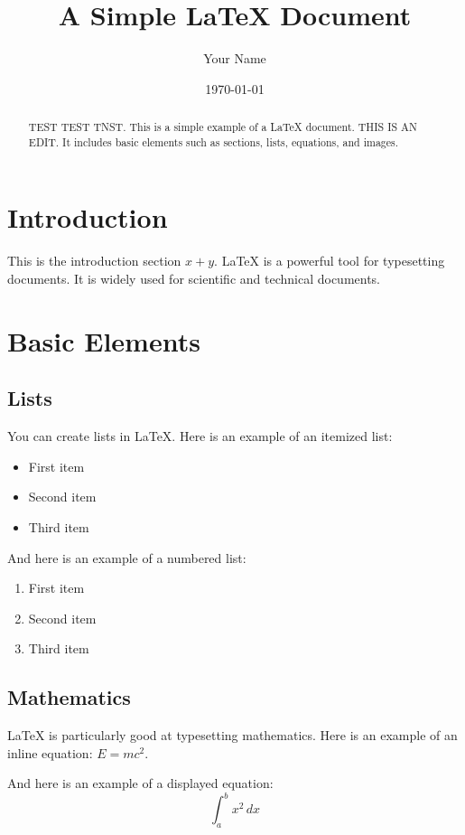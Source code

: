 \documentclass{article}
\title{A Simple LaTeX Document}
\author{Your Name}
\date{\today}
\begin{document}
\maketitle

\begin{abstract}
TEST TEST TNST. This is a simple example of a LaTeX document. THIS IS AN EDIT. It includes basic elements such as sections, lists, equations, and images.
\end{abstract}

\section{Introduction}

This is the introduction section $x+y$. LaTeX is a powerful tool for typesetting documents. It is widely used for scientific and technical documents.

\section{Basic Elements}

\subsection{Lists}

You can create lists in LaTeX. Here is an example of an itemized list:
\begin{itemize}
    \item First item
    \item Second item
    \item Third item
\end{itemize}

And here is an example of a numbered list:
\begin{enumerate}
    \item First item
    \item Second item
    \item Third item
\end{enumerate}

\subsection{Mathematics}

LaTeX is particularly good at typesetting mathematics. Here is an example of an inline equation: \( E = mc^2 \).

And here is an example of a displayed equation:
\[
\int_{a}^{b} x^2 \, dx
\]
\end{document}
